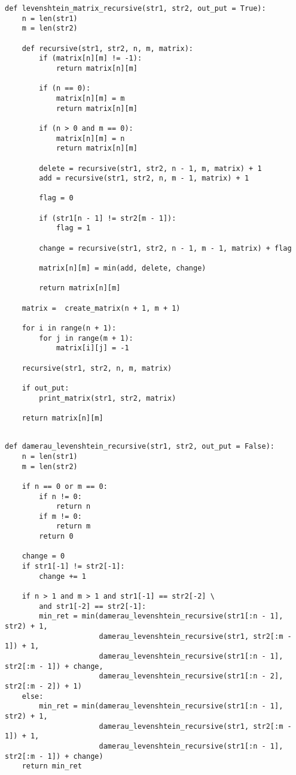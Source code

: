 \begin{lstlisting}[label=lst:lev_rec_mat,caption=Функция нахождения расстояния Левенштейна с использованием рекурсии.]
def levenshtein_matrix_recursive(str1, str2, out_put = True):
	n = len(str1)
	m = len(str2)
	
	def recursive(str1, str2, n, m, matrix):
		if (matrix[n][m] != -1):
			return matrix[n][m]
		
		if (n == 0):
			matrix[n][m] = m
			return matrix[n][m]
		
		if (n > 0 and m == 0):
			matrix[n][m] = n
			return matrix[n][m]
		
		delete = recursive(str1, str2, n - 1, m, matrix) + 1
		add = recursive(str1, str2, n, m - 1, matrix) + 1
		
		flag = 0
		
		if (str1[n - 1] != str2[m - 1]):
			flag = 1
		
		change = recursive(str1, str2, n - 1, m - 1, matrix) + flag
		
		matrix[n][m] = min(add, delete, change)
		
		return matrix[n][m]
	
	matrix =  create_matrix(n + 1, m + 1)
	
	for i in range(n + 1):
		for j in range(m + 1):
			matrix[i][j] = -1
	
	recursive(str1, str2, n, m, matrix)
	
	if out_put:
		print_matrix(str1, str2, matrix)
	
	return matrix[n][m]
	
\end{lstlisting}

\begin{lstlisting}[label=lst:dlev,caption=Функция нахождения расстояния Левенштейна с использованием рекурсии.]
def damerau_levenshtein_recursive(str1, str2, out_put = False):
	n = len(str1)
	m = len(str2)
	
	if n == 0 or m == 0:
		if n != 0:
			return n
		if m != 0:
			return m
		return 0
	
	change = 0
	if str1[-1] != str2[-1]:
		change += 1
	
	if n > 1 and m > 1 and str1[-1] == str2[-2] \
		and str1[-2] == str2[-1]:
		min_ret = min(damerau_levenshtein_recursive(str1[:n - 1], str2) + 1,
					  damerau_levenshtein_recursive(str1, str2[:m - 1]) + 1,
				      damerau_levenshtein_recursive(str1[:n - 1], str2[:m - 1]) + change,
		              damerau_levenshtein_recursive(str1[:n - 2], str2[:m - 2]) + 1)
	else:
		min_ret = min(damerau_levenshtein_recursive(str1[:n - 1], str2) + 1,
		              damerau_levenshtein_recursive(str1, str2[:m - 1]) + 1,
		              damerau_levenshtein_recursive(str1[:n - 1], str2[:m - 1]) + change)
	return min_ret
	
\end{lstlisting}

